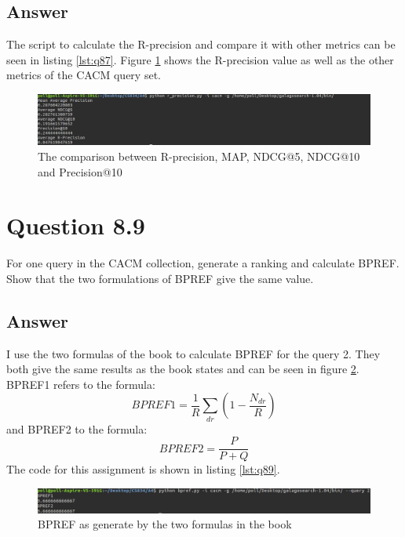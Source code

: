 \documentclass{article}
\begin{document}
	\subsection*{Answer}
	The script to calculate the R-precision and compare it with other metrics can be seen in listing \ref{lst:q87}. Figure \ref{fig:q87} shows the R-precision value as well as the other metrics of the CACM query set.
	
	\begin{figure}[h]
		\includegraphics[width=\linewidth]{q87.png}
		\caption{The comparison between R-precision, MAP, NDCG@5, NDCG@10 and Precision@10}
		\label{fig:q87}
	\end{figure}
	\section*{Question 8.9}
	For one query in the CACM collection, generate a ranking and calculate
	BPREF. Show that the two formulations of BPREF give the same value.
	\subsection*{Answer}
	I use the two formulas of the book to calculate BPREF for the query 2. They both give the same results as the book states and can be seen in figure \ref{fig:q89}. BPREF1 refers to the formula: 	         $$BPREF1=\frac{1}{R}\sum_{dr}^{}(1-\frac{N_{dr}}{R})$$ 
	and BPREF2 to the formula:
	$$BPREF2=\frac{P}{P+Q}$$ 
	The code for this assignment is shown in listing \ref{lst:q89}.
	\begin{figure}[h]
		\includegraphics[width=\linewidth]{q89.png}
		\caption{BPREF as generate by the two formulas in the book}
		\label{fig:q89}
	\end{figure}
	
	
\end{document}
